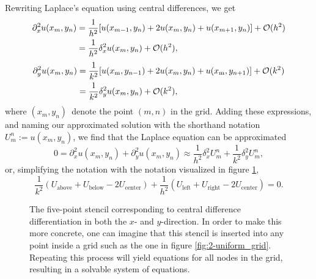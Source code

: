Rewriting Laplace's equation using central differences, we get
\begin{equation*}
    \begin{split}
    \partial^2_x u(x_m, y_n) 
        &= \frac{1}{h^2}[u(x_{m-1},y_n) + 2u(x_m,y_n) + u(x_{m+1},y_n)] + \mathcal{O}(h^2)\\
        &= \frac{1}{h^2}\delta^2_x u(x_m,y_n) + \mathcal{O}(h^2),\\
    \end{split}
\end{equation*}
\begin{equation*}
    \begin{split}
    \partial^2_y u(x_m, y_n) 
        &= \frac{1}{k^2}[u(x_\text{m},y_{n-1}) + 2u(x_m,y_n) + u(x_\text{m},y_{n+1})] + \mathcal{O}(k^2)\\
        &= \frac{1}{k^2}\delta^2_y u(x_m,y_n) + \mathcal{O}(k^2),\\
    \end{split}
\end{equation*}
where $(x_m, y_n)$ denote the point $(m,n)$ in the grid. 
Adding these expressions, and naming our approximated solution with the shorthand notation $U_m^n := u(x_m,y_n)$, we find that the Laplace equation can be approximated 
\begin{equation*}
    0 = \partial^2_x u(x_m,y_n) + \partial^2_y u(x_m,y_n)
    \approx \frac{1}{h^2}\delta^2_x U_m^n + \frac{1}{k^2}\delta^2_y U_m^n,
\end{equation*}
or, simplifying the notation with the notation visualized in figure \ref{ex3:fig:stencil},
\begin{equation*}
    \frac{1}{k^2}(U_\text{above} + U_\text{below} - 2U_\text{center}) + \frac{1}{h^2}(U_\text{left} + U_\text{right} - 2U_\text{center}) = 0.
\end{equation*}

\begin{figure}[htb]
    \centering
    
    \caption{The five-point stencil corresponding to central difference differentiation in both the $x$- and $y$-direction. In order to make this more concrete, one can imagine that this stencil is inserted into any point inside a grid such as the one in figure \ref{fig:2-uniform_grid}. Repeating this process will yield equations for all nodes in the grid, resulting in a solvable system of equations.}
    \label{ex3:fig:stencil}
\end{figure}

